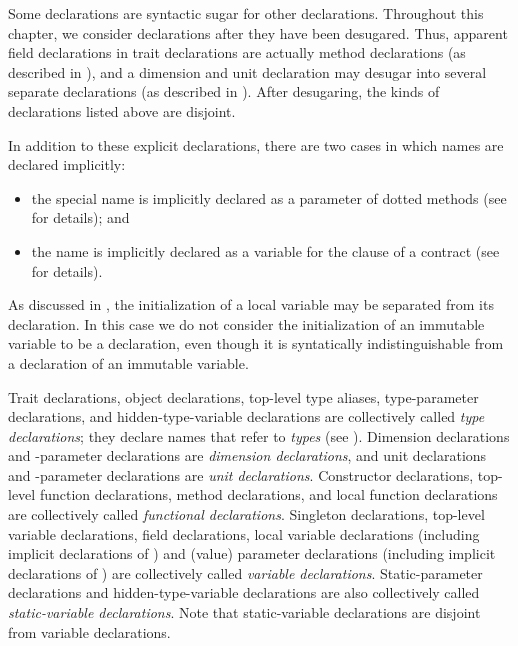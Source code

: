Some declarations are syntactic sugar
for other declarations.
Throughout this chapter,
we consider declarations after they have been desugared.
Thus, apparent field declarations in trait declarations
are actually method declarations (as described in ),
and a dimension and unit declaration
may desugar into several separate declarations
(as described in ).
After desugaring, the kinds of declarations listed above are disjoint.

In addition to these explicit declarations,
there are two cases in which names are declared implicitly:
\begin{itemize}

\item
the special name  is implicitly declared
as a parameter of dotted methods
(see  for details);
and

\item
the name  is implicitly declared
as a variable for the  clause of a contract
(see  for details).

\end{itemize}

As discussed in , 
the initialization of a local variable 
may be separated from its declaration.
In this case 
we do not consider the initialization of an immutable variable 
to be a declaration, 
even though it is syntatically indistinguishable 
from a declaration of an immutable variable.

Trait declarations,
object declarations,
top-level type aliases,
type-parameter declarations,
and hidden-type-variable declarations
are collectively called \emph{type declarations};
they declare names that refer to \emph{types}
(see ).
Dimension declarations
and -parameter declarations
are \emph{dimension declarations},
and unit declarations
and -parameter declarations
are \emph{unit declarations}.
Constructor declarations,
top-level function declarations,
method declarations,
and local function declarations
are collectively called \emph{functional declarations}.
Singleton declarations,
top-level variable declarations,
field declarations,
local variable declarations
(including implicit declarations of )
and (value) parameter declarations
(including implicit declarations of )
are collectively called \emph{variable declarations}.
Static-parameter declarations
and hidden-type-variable declarations are also
collectively called \emph{static-variable declarations}.
Note that static-variable declarations are disjoint
from variable declarations.

